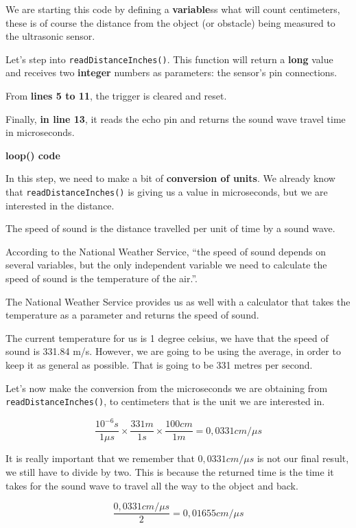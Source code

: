 We are starting this code by defining a \textbf{variable}ss what will count centimeters, these is of course the distance from the object (or obstacle) being measured to the ultrasonic sensor.

Let's step into \verb|readDistanceInches()|. This function will return a \textbf{long} value and receives two \textbf{integer} numbers as parameters: the sensor's pin connections.

From \textbf{lines 5 to 11}, the trigger is cleared and reset.

Finally, \textbf{in line 13}, it reads the echo pin and returns the sound wave travel time in microseconds.

\vspace{5mm}
\textbf{loop() code}

In this step, we need to make a bit of \textbf{conversion of units}. We already know that \verb|readDistanceInches()| is giving us a value in microseconds, but we are interested in the distance.

The speed of sound is the distance travelled per unit of time by a sound wave.

According to the National Weather Service, ``the speed of sound depends on several variables, but the only independent variable we need to calculate the speed of sound is  the temperature of the air.''\cite{speedofsound}.

The National Weather Service provides us as well with a calculator that takes the temperature as a parameter and returns the speed of sound.

The current temperature for us is 1 degree celsius, we have that the speed of sound is 331.84 m/s. However, we are going to be using the average, in order to keep it as general as possible. That is going to be 331 metres per second.

\vspace{5mm}
Let's now make the conversion from the microseconds we are obtaining from \verb|readDistanceInches()|, to centimeters that is the unit we are interested in.

\[     \frac{10^{-6}s}{1\mu s} \times \frac{331m}{1s} \times \frac{100cm}{1m} = 0,0331cm/\mu s \]

It is really important that we remember that \(0,0331cm/\mu s\) is not our final result, we still have to divide by two. This is because the returned time is the time it takes for the sound wave to travel all the way to the object and back.

\[     \frac{0,0331cm/\mu s}{2} = 0,01655 cm/\mu s \]

